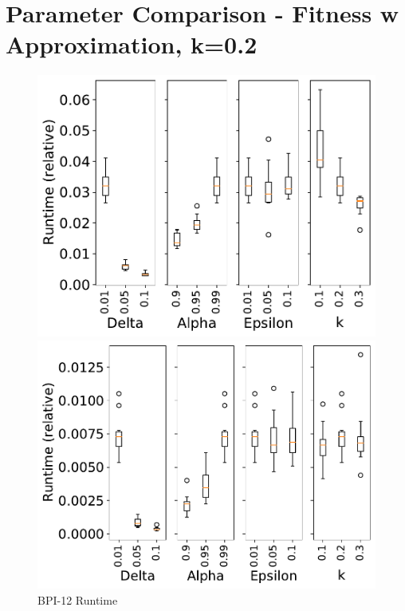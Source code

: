 \documentclass[landscape]{article}
\begin{document}
	\section*{Parameter Comparison - Fitness w Approximation, k=0.2}
	\begin{figure}[!htb]
	\centering
	\begin{minipage}{0.2\textwidth}
		\includegraphics[width=1.0\textwidth]{../BPI_Challenge_2012/BPI_Challenge_2012_param_time_Approx_k02.pdf}
		\caption{BPI-12 Runtime}
	\end{minipage}
	\hfill
	\begin{minipage}{0.2\textwidth}
		\includegraphics[width=1.0\textwidth]{../Detail_Incident_Activity/Detail_Incident_Activity_param_time_Approx_k02.pdf}

\end{minipage}
\end{figure}
\end{document}

